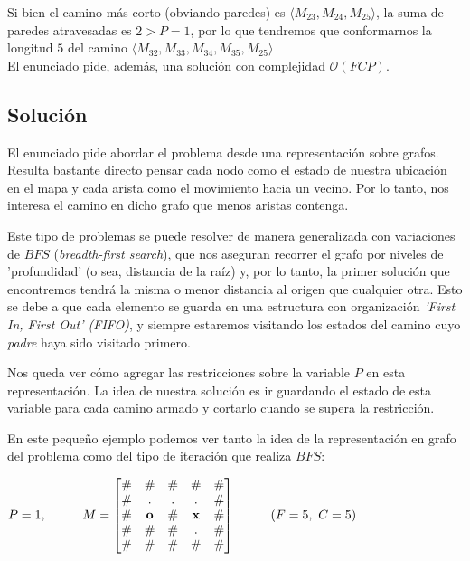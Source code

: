 Si bien el camino más corto (obviando paredes) es $\langle {M_{23}, M_{24}, M_{25}} \rangle$, la suma de paredes atravesadas es $2 > P = 1$, por lo que tendremos que conformarnos la longitud $5$ del camino  $\langle {M_{32}, M_{33}, M_{34}, M_{35}, M_{25}} \rangle$
\\

El enunciado pide, además, una solución con complejidad $\mathcal{O}(FCP)$.

\subsection{Solución}

El enunciado pide abordar el problema desde una representación sobre grafos. Resulta bastante directo pensar cada nodo como el estado de nuestra ubicación en el mapa y cada arista como el movimiento hacia un vecino. Por lo tanto, nos interesa el camino en dicho grafo que menos aristas contenga.

Este tipo de problemas se puede resolver de manera generalizada con variaciones de $BFS$ (\emph{breadth-first search}), que nos aseguran recorrer el grafo por niveles de 'profundidad' (o sea, distancia de la raíz) y, por lo tanto, la primer solución que encontremos tendrá la misma o menor distancia al origen que cualquier otra. Esto se debe a que cada elemento se guarda en una estructura con organización \emph{'First In, First Out' (FIFO)}, y siempre estaremos visitando los estados del camino cuyo \emph{padre} haya sido visitado primero.

Nos queda ver cómo agregar las restricciones sobre la variable $P$ en esta representación. La idea de nuestra solución es ir guardando el estado de esta variable para cada camino armado y cortarlo cuando se supera la restricción.

En este pequeño ejemplo podemos ver tanto la idea de la representación en grafo del problema como del tipo de iteración que realiza $BFS$:

    \begin{center}
        $P=1, \kern 1cm
        M =
        \begin{bmatrix}
            \# & \# & \# & \# & \# \\
            \# & . & . & . & \# \\
            \# & \mathbf{o} & \# & \mathbf{x} & \# \\
            \# & \# & \# & . & \# \\
            \# & \# & \# & \# & \#
        \end{bmatrix}
        \kern 1cm
        (F = 5,\ C = 5)
        $

    \end{center}


